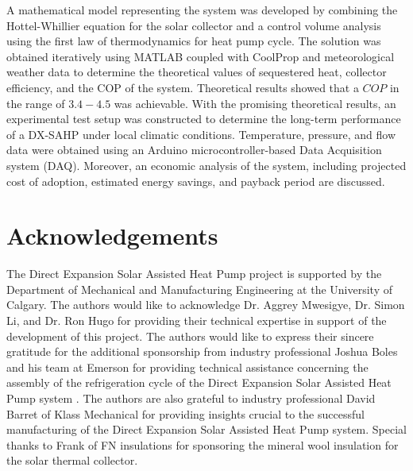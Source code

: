 \documentclass{ucalgarythesis}
\begin{document}
\medskip
A mathematical model representing the system was developed by combining the Hottel-Whillier equation for the solar collector and a control volume analysis using the first law of thermodynamics for heat pump cycle. The solution was obtained iteratively using MATLAB coupled with CoolProp and meteorological weather data to determine the theoretical values of
sequestered heat, collector efficiency, and the COP of the system. Theoretical results showed that a $COP$ in the range of $3.4 - 4.5$ was achievable. With the promising theoretical results, an experimental test setup was constructed to determine the long-term performance of a DX-SAHP under local climatic conditions. Temperature, pressure, and flow data were obtained using an Arduino microcontroller-based Data Acquisition system (DAQ). Moreover, an economic analysis of the system, including projected cost of adoption,
estimated energy savings, and payback period are discussed.

\newpage

 
\chapter{Acknowledgements}  
The Direct Expansion Solar Assisted Heat Pump project is supported by the Department of Mechanical and Manufacturing Engineering at the University of Calgary. The authors would like to acknowledge Dr. Aggrey Mwesigye, Dr. Simon Li, and Dr. Ron Hugo for providing their technical expertise in support of the development of this project. The authors would like to express their sincere gratitude for the additional sponsorship from industry professional Joshua Boles and his team at Emerson for providing technical assistance concerning the assembly of the refrigeration cycle of the Direct Expansion Solar Assisted Heat Pump system . The authors are also grateful to industry professional David Barret of Klass Mechanical for providing insights crucial to the successful manufacturing of the Direct Expansion Solar Assisted Heat Pump system. Special thanks to Frank of FN insulations for sponsoring the mineral wool insulation for the solar thermal collector.
\newpage

    
\tableofcontents
\newpage
\end{document}
